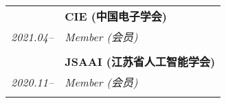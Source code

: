 \documentclass[paper=a4,fontsize=11pt]{scrartcl}
\begin{document}
\begin{longtable}{r|p{11cm}}
	~ & \textbf{CIE (中国电子学会)} \\
	\emph{2021.04--} & \emph{Member (会员)}\\
	\multicolumn{2}{c}{} \\
	

	
	
	~ & \textbf{JSAAI (江苏省人工智能学会)} \\
	\emph{2020.11--} & \emph{Member (会员)}\\
	\multicolumn{2}{c}{} 
	
	
\end{longtable}
\end{document}
